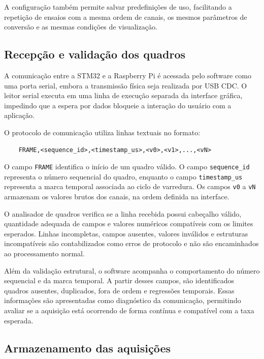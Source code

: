 \documentclass[a4paper,12pt]{fcte}
\begin{document}
A configuração também permite salvar predefinições de uso, facilitando a repetição de ensaios com a mesma ordem de canais, os mesmos parâmetros de conversão e as mesmas condições de visualização.

\subsection{Recepção e validação dos quadros}
\label{subsec:recepcao_validacao_software}

A comunicação entre a STM32 e a Raspberry Pi é acessada pelo software como uma porta serial, embora a transmissão física seja realizada por USB CDC. O leitor serial executa em uma linha de execução separada da interface gráfica, impedindo que a espera por dados bloqueie a interação do usuário com a aplicação.

O protocolo de comunicação utiliza linhas textuais no formato:

\begin{verbatim}
    FRAME,<sequence_id>,<timestamp_us>,<v0>,<v1>,...,<vN>
\end{verbatim}

O campo \texttt{FRAME} identifica o início de um quadro válido. O campo \texttt{sequence\_id} representa o número sequencial do quadro, enquanto o campo \texttt{timestamp\_us} representa a marca temporal associada ao ciclo de varredura. Os campos \texttt{v0} a \texttt{vN} armazenam os valores brutos dos canais, na ordem definida na interface.

O analisador de quadros verifica se a linha recebida possui cabeçalho válido, quantidade adequada de campos e valores numéricos compatíveis com os limites esperados. Linhas incompletas, campos ausentes, valores inválidos e estruturas incompatíveis são contabilizados como erros de protocolo e não são encaminhados ao processamento normal.

Além da validação estrutural, o software acompanha o comportamento do número sequencial e da marca temporal. A partir desses campos, são identificados quadros ausentes, duplicados, fora de ordem e regressões temporais. Essas informações são apresentadas como diagnóstico da comunicação, permitindo avaliar se a aquisição está ocorrendo de forma contínua e compatível com a taxa esperada.

\subsection{Armazenamento das aquisições}
\label{subsec:armazenamento_software}
\end{document}
